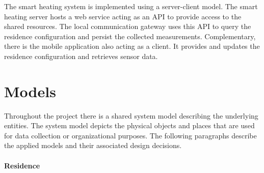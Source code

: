 The smart heating system is implemented using a server-client model.
The smart heating server hosts a web service acting as an API to provide access to the shared resources.
The local communication gateway uses this API to query the residence configuration and persist the collected measurements.
Complementary, there is the mobile application also acting as a client.
It provides and updates the residence configuration and retrieves sensor data.




\section{Models}
\label{sec:system_overview_models}

Throughout the project there is a shared system model describing the underlying entities. The system model depicts the physical objects and places that are used for data collection or organizational purposes. The following paragraphs describe the applied models and their associated design decisions.


\paragraph{Residence}

